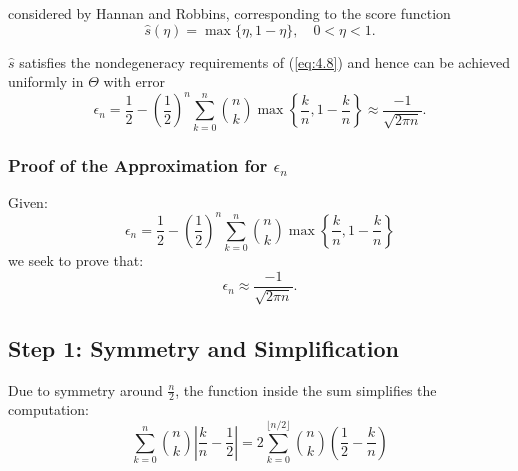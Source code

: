 \documentclass[11pt]{article}
\numberwithin{equation}{section}
\theoremstyle{boldStyle}
\begin{document}
considered by Hannan and Robbins, corresponding to the score function
\begin{equation} \label{eq:4.13}
    \hat{s}(\eta) = \max \{\eta, 1 - \eta\}, \quad 0 < \eta < 1.
\end{equation}

$\hat{s}$ satisfies the nondegeneracy requirements of (\ref{eq:4.8}) and hence can be achieved uniformly in $\Theta$ with error
\[
    \epsilon_n =  \frac{1}{2} - \left(\frac{1}{2}\right)^n \sum_{k=0}^n \binom{n}{k} \max \left\{ \frac{k}{n}, 1 - \frac{k}{n} \right\} \approx \frac{-1}{\sqrt{2\pi n}}.
\]






\subsubsection{Proof of the Approximation for $\epsilon_n$}

Given:
\[
    \epsilon_n =  \frac{1}{2} - \left(\frac{1}{2}\right)^n \sum_{k=0}^n \binom{n}{k} \max \left\{ \frac{k}{n}, 1 - \frac{k}{n} \right\}
\]
we seek to prove that:
\[
    \epsilon_n \approx \frac{-1}{\sqrt{2\pi n}}.
\]

\subsection*{Step 1: Symmetry and Simplification}
Due to symmetry around $\frac{n}{2}$, the function inside the sum simplifies the computation:
\[
    \sum_{k=0}^n \binom{n}{k} \left| \frac{k}{n} - \frac{1}{2} \right| = 2 \sum_{k=0}^{\lfloor n/2 \rfloor} \binom{n}{k} \left( \frac{1}{2} - \frac{k}{n} \right)
\]
\end{document}
